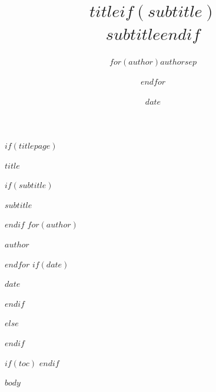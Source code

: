 \documentclass[
$if(fontsize)$
  $fontsize$,
$endif$
$if(papersize)$
  $papersize$paper,
$else$
  a4paper,
$endif$
$for(classoption)$
  $classoption$$sep$,
$endfor$
]{article}
\title{$title$$if(subtitle)$\\[0.4em]\large $subtitle$$endif$}
\author{$for(author)$$author$$sep$ \and $endfor$}
\date{$date$}
\begin{document}
$if(titlepage)$
\begin{titlepage}
\thispagestyle{empty}
\centering
\vspace*{4cm}
{\Huge\bfseries $title$\par}
$if(subtitle)$
\vspace{0.8cm}
{\Large $subtitle$\par}
$endif$
\vspace{2cm}
$for(author)$
{\large $author$\par}
$endfor$
$if(date)$
\vspace{0.4cm}
{\large $date$\par}
$endif$
\vfill
\end{titlepage}
$else$
\maketitle
$endif$

$if(toc)$
{
\hypersetup{linkcolor=black}
\setcounter{tocdepth}{$if(toc-depth)$$toc-depth$$else$2$endif$}
\tableofcontents
\newpage
}
$endif$

$body$
\end{document}
